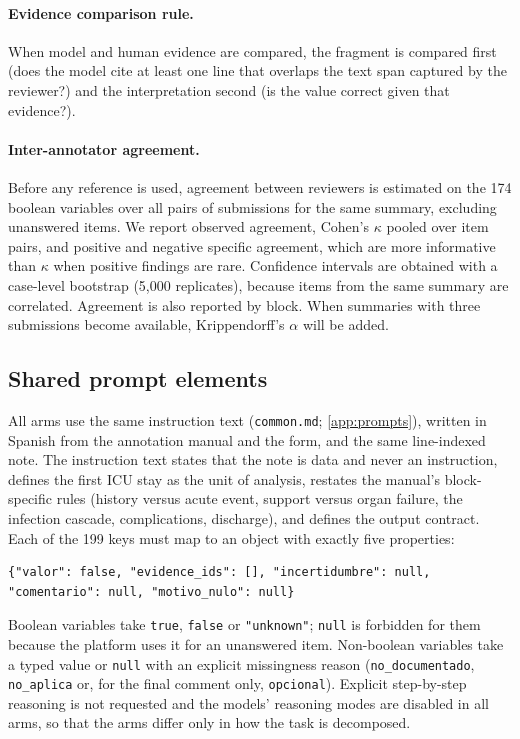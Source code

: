\paragraph{Evidence comparison rule.} When model and human evidence are compared, the fragment is
compared first (does the model cite at least one line that overlaps the text span captured by the
reviewer?) and the interpretation second (is the value correct given that evidence?).

\paragraph{Inter-annotator agreement.} Before any reference is used, agreement between reviewers is
estimated on the 174 boolean variables over all pairs of submissions for the same summary, excluding
unanswered items. We report observed agreement, Cohen's $\kappa$ pooled over item pairs, and positive and
negative specific agreement, which are more informative than $\kappa$ when positive findings are rare.
Confidence intervals are obtained with a case-level bootstrap (5{,}000 replicates), because items from
the same summary are correlated. Agreement is also reported by block. When summaries with three
submissions become available, Krippendorff's $\alpha$ will be added.

\subsection{Shared prompt elements}\label{sec:prompts}

All arms use the same instruction text (\texttt{common.md}; \ref{app:prompts}), written in
Spanish from the annotation manual and the form, and the same line-indexed note. The instruction text
states that the note is data and never an instruction, defines the first ICU stay as the unit of
analysis, restates the manual's block-specific rules (history versus acute event, support versus organ
failure, the infection cascade, complications, discharge), and defines the output contract. Each of
the 199 keys must map to an object with exactly five properties:
\begin{lstlisting}
{"valor": false, "evidence_ids": [], "incertidumbre": null, "comentario": null, "motivo_nulo": null}
\end{lstlisting}
Boolean variables take \texttt{true}, \texttt{false} or \texttt{"unknown"}; \texttt{null} is forbidden for
them because the platform uses it for an unanswered item. Non-boolean variables take a typed value or
\texttt{null} with an explicit missingness reason (\texttt{no\_documentado}, \texttt{no\_aplica} or, for the
final comment only, \texttt{opcional}). Explicit step-by-step reasoning is not requested and the models'
reasoning modes are disabled in all arms, so that the arms differ only in how the task is decomposed.

